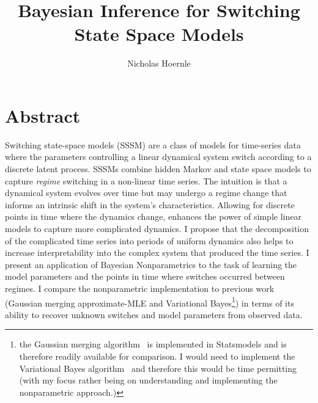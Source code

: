 \documentclass[twoside]{article}
\title{Bayesian Inference for Switching State Space Models}
\author{Nicholas Hoernle}
\begin{document}
\maketitle
\section{Abstract}
Switching state-space models (SSSM) are a class of models for time-series data where the parameters controlling a linear dynamical system switch according to a discrete latent process. SSSMs combine hidden Markov and state space models to capture \textit{regime} switching in a non-linear time series. The intuition is that a dynamical system evolves over time but may undergo a regime change that informs an intrinsic shift in the system's characteristics. Allowing for discrete points in time where the dynamics change, enhances the power of simple linear models to capture more complicated dynamics. I propose that the decomposition of the complicated time series into periods of uniform dynamics also helps to increase interpretability into the complex system that produced the time series. I present an application of Bayesian Nonparametrics to the task of learning the model parameters and the points in time where switches occurred between regimes. I compare the nonparametric implementation to previous work (Gaussian merging approximate-MLE and Variational Bayes\footnote{the Gaussian merging algorithm~\cite{kim1999state} is implemented in Statsmodels and is therefore readily available for comparison. I would need to implement the Variational Bayes algorithm~\cite{ghahramani2000variational} and therefore this would be time permitting (with my focus rather being on understanding and implementing the nonparametric approach.)}) in terms of its ability to recover unknown switches and model parameters from observed data.



\end{document}
